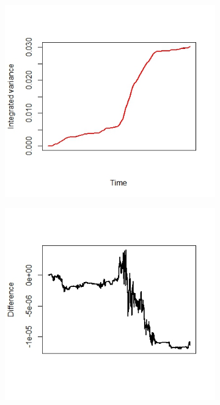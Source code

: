 \documentclass{article}
\begin{document}
\begin{figure}[h]
    \centering
    \begin{subfigure}{0.32\textwidth}
        \centering
        \includegraphics[width=\textwidth]{ex5_scale1.jpeg}
    \end{subfigure}\hfill
    \begin{subfigure}{0.32\textwidth}
        \centering
        \includegraphics[width=\textwidth]{ex5_scale2.jpeg}

\end{subfigure}
\end{figure}
\end{document}
